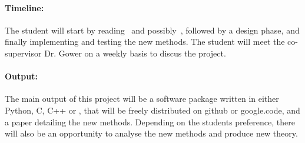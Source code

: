 \documentclass[11pt]{article}
\begin{document}
\paragraph{Timeline:} The student will start by reading~\cite{Gower2015,Gower2016} and possibly~\cite{Drineas2006a,Pilanci2014}, followed by a design phase, and finally implementing and testing the new methods. The student will meet the co-supervisor Dr. Gower on a weekly basis to discus the project.

\paragraph{Output:}   The main output of this project will be a software package written in either Python, C, C++ or , that will be freely distributed on github or google.code, and a paper detailing the new methods. Depending on the students preference, there will also be an opportunity to analyse the new methods and produce new theory.


{ 
\printbibliography
}
\end{document}
